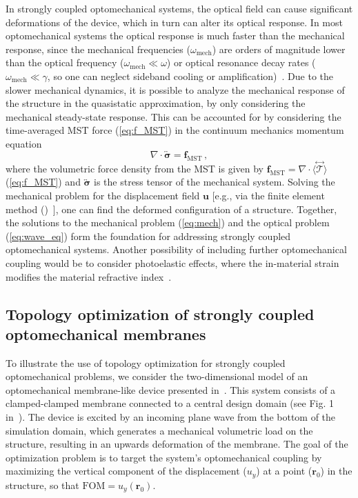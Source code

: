 In strongly coupled optomechanical systems, the optical field can cause significant deformations of the device,
 which in turn can alter its optical response. In most optomechanical systems the optical response is much faster than the mechanical response, since the 
mechanical frequencies ($\omega_\text{mech}$) are orders of magnitude lower than the optical frequency ($\omega_\text{mech}\ll\omega$) or optical resonance decay rates ($\omega_\text{mech}\ll\gamma$, so one 
can neglect sideband cooling or amplification)~\cite{opto_crys, photo_topopt, ownpub5}. Due to the slower mechanical dynamics, it is possible to analyze the mechanical response of the structure in the quasistatic approximation, by only considering the mechanical steady-state response. 
This can be accounted for by considering the time-averaged MST force (\eqref{eq:f_MST}) in the continuum mechanics momentum equation
\begin{equation}\label{eq:mech}
    \nabla \cdot \overleftrightarrow{\boldsymbol{\sigma}} = \mathbf{f}_\text{MST}  \,,
\end{equation}
where the volumetric force density from the MST is given by $ \mathbf{f}_\text{MST} = \nabla \cdot \langle \stackrel{\leftrightarrow}{\bm{\mathcal{T}}} \rangle$ (\eqref{eq:f_MST}) and $\overleftrightarrow{\boldsymbol{\sigma}}$ is the stress tensor of the mechanical system. Solving the mechanical problem for the
displacement field $\mathbf{u}$ [e.g., via the finite element method ()~\cite{cook_concepts_2001}], one can find the deformed configuration of a structure. Together, the 
solutions to the mechanical problem (\eqref{eq:mech}) and the optical problem (\eqref{eq:wave_eq}) 
form the foundation for addressing strongly coupled optomechanical systems. Another possibility of including further optomechanical coupling would be to consider
photoelastic effects, where the in-material strain modifies the material refractive index~\cite{photoelasticity}.

\subsection*{Topology optimization of strongly coupled optomechanical membranes}

To illustrate the use of topology optimization for strongly coupled optomechanical problems, we consider the two-dimensional model of an optomechanical membrane-like device presented in~\cite{ownpub5}. 
This system consists of a clamped-clamped membrane connected to a central design domain (see Fig. 1 in~\cite{ownpub5}). The device is excited by an incoming plane wave from the bottom of the simulation domain, which generates a mechanical volumetric load on the structure,
resulting in an upwards deformation of the membrane. The goal of the optimization problem is to target the system's optomechanical coupling by maximizing the vertical component of the displacement ($u_y$) at a point ($\mathbf{r}_0$)
in the structure, so that $\text{FOM}=u_y(\mathbf{r}_0)$.

